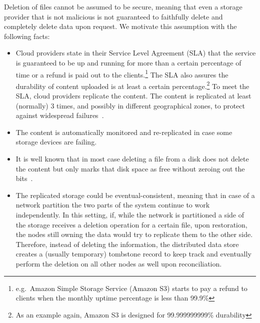 Deletion of files cannot be assumed to be secure, meaning that even a storage provider that is
not malicious is not guaranteed to faithfully delete and completely delete data upon request.
We motivate this assumption with the following facts:
\begin{itemize}
    \item Cloud providers state in their Service Level Agreement (SLA) that
    the service is guaranteed to be up and running for more than a certain percentage of time or a refund is paid out to the clients.\footnote{e.g.\ Amazon Simple Storage Service (Amazon S3) starts to pay a refund to clients when the monthly uptime percentage is less than 99.9\%}
    The SLA also assures the durability of content uploaded is at least a certain percentage.\footnote{As an example again, Amazon S3 is designed for 99.999999999\% durability}
    To meet the SLA, cloud providers replicate the content. The content is replicated at least (normally) 3 times, and possibly in different geographical zones, to protect against widespread failures~\cite{AzureBlobStorage}.
    \item The content is automatically monitored and re-replicated in case some storage devices are failing.
    \item It is well known that in most case deleting a file from a disk does not delete the content but only marks that disk space as free without zeroing out the bits~\cite{manRM}.
    \item The replicated storage could be eventual-consistent, 
    meaning that in case of a network partition the two 
    parts of the system continue to work independently. 
    In this setting, if, while the network is partitioned a side of the storage receives a deletion operation 
    for a certain file, upon restoration,
    the nodes still owning the data would try to replicate 
    them to the other side.
    Therefore, instead of deleting the information, 
    the distributed data store creates a (usually temporary) 
    tombstone record to keep track and eventually perform 
    the deletion on all other nodes as well upon reconciliation.
\end{itemize}

